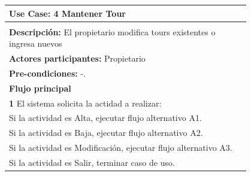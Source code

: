 \documentclass[12pt,a4paper,titlepage,oneside]{article}
\begin{document}
\begin{tabular}{| l | p{0.8\linewidth} |} \hline
	\multicolumn{2}{|p{0.8\linewidth}|}{\textbf{Use Case:} 4 Mantener Tour} \\\hline
	\multicolumn{2}{|c|}{} \\ \hline
	\multicolumn{2}{|p{0.8\linewidth}|}{\textbf{Descripci\'on:} El propietario modifica tours existentes o ingresa nuevos} \\ \hline
	\multicolumn{2}{|p{0.8\linewidth}|}{\textbf{Actores participantes:} Propietario} \\ \hline
	\multicolumn{2}{|p{0.8\linewidth}|}{\textbf{Pre-condiciones:} -.} \\ 			    \hline
		\multicolumn{2}{|p{0.8\linewidth}|}{\textbf{Flujo principal}} \\ \hline
	\multicolumn{2}{|p{0.8\linewidth}|}{\textbf{1}  El sistema solicita la actidad a realizar: } \\ \hline
	\multicolumn{2}{|p{0.8\linewidth}|}{  Si la actividad es Alta, ejecutar flujo alternativo A1.} \\ \hline
	\multicolumn{2}{|p{0.8\linewidth}|}{  Si la actividad es Baja, ejecutar flujo alternativo A2.} \\ \hline
		\multicolumn{2}{|p{0.8\linewidth}|}{  Si la actividad es Modificación, ejecutar flujo alternativo A3.} \\ \hline
		\multicolumn{2}{|p{0.8\linewidth}|}{  Si la actividad es Salir, terminar caso de uso.} \\ \hline


\end{tabular}
\end{document}
